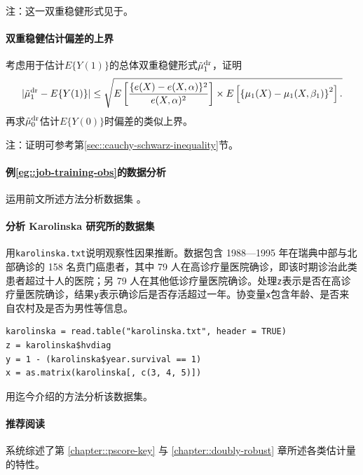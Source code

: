 注：这一双重稳健形式见于\citet{robins2007comment}。 



\paragraph{双重稳健估计偏差的上界}\label{hw::upperbound-dr}


考虑用于估计$E\{  Y(1) \} $的总体双重稳健形式$\tilde{\mu}_1^\textup{dr} $，证明
$$
 |   \tilde{\mu}_1^\textup{dr} - E\{  Y(1) \}  |  \leq
\sqrt{
E\left[   \frac{ \{  e(X) - e(X,\alpha)\}^2  }{  e(X,\alpha)^2 }  \right] \times 
E\left[  \left\{  \mu_1(X) -  \mu_1(X, \beta_1)   \right\}^2 \right] .
}
$$
再求$\tilde{\mu}_0^\textup{dr} $估计$E\{  Y(0) \} $时偏差的类似上界。 


注：证明可参考第\ref{sec::cauchy-schwarz-inequality}节。 


\paragraph{例\ref{eg::job-training-obs}的数据分析}


运用前文所述方法分析数据集 。 

 
 
\paragraph{分析 Karolinska 研究所的数据集}\label{hw::Karolinska-dr}
 
 \citet{rubin2008objective}用\texttt{karolinska.txt}说明观察性因果推断。数据包含 1988—1995 年在瑞典中部与北部确诊的 158 名贲门癌患者，其中 79 人在高诊疗量医院确诊，即该时期诊治此类患者超过十人的医院；另 79 人在其他低诊疗量医院确诊。处理\texttt{z}表示是否在高诊疗量医院确诊，结果\texttt{y}表示确诊后是否存活超过一年。协变量\texttt{x}包含年龄、是否来自农村及是否为男性等信息。 
 
\begin{lstlisting}
karolinska = read.table("karolinska.txt", header = TRUE)
z = karolinska$hvdiag
y = 1 - (karolinska$year.survival == 1)
x = as.matrix(karolinska[, c(3, 4, 5)])
\end{lstlisting}


用迄今介绍的方法分析该数据集。 



 \paragraph{推荐阅读}
 
 \citet{lunceford2004stratification} 系统综述了第 \ref{chapter::pscore-key} 与 \ref{chapter::doubly-robust} 章所述各类估计量的特性。 
 

